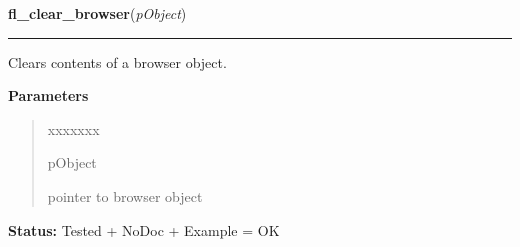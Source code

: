     \label{xformslib:library:fl_clear_browser}

    \vspace{0.5ex}

\hspace{.8\funcindent}\begin{boxedminipage}{\funcwidth}

    \raggedright \textbf{fl\_clear\_browser}(\textit{pObject})

    \vspace{-1.5ex}

    \rule{\textwidth}{0.5\fboxrule}
\setlength{\parskip}{2ex}
    Clears contents of a browser object.

\setlength{\parskip}{1ex}
      \textbf{Parameters}
      \vspace{-1ex}

      \begin{quote}
        \begin{Ventry}{xxxxxxx}

          \item[pObject]

          pointer to browser object

        \end{Ventry}

      \end{quote}

\textbf{Status:} Tested + NoDoc + Example = OK



    \end{boxedminipage}

    \label{xformslib:library:fl_add_browser_line}

    \vspace{0.5ex}

